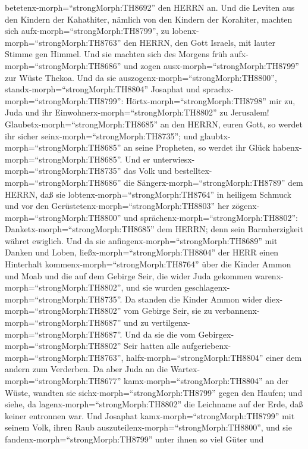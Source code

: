 betetenx-morph=``strongMorph:TH8692'' den HERRN an.  Und
die Leviten aus den Kindern der Kahathiter, nämlich von den Kindern der
Korahiter, machten sich aufx-morph=``strongMorph:TH8799'', zu
lobenx-morph=``strongMorph:TH8763'' den HERRN, den Gott Israels, mit
lauter Stimme gen Himmel.  Und sie machten sich des Morgens
früh aufx-morph=``strongMorph:TH8686'' und zogen
ausx-morph=``strongMorph:TH8799'' zur Wüste Thekoa. Und da sie
auszogenx-morph=``strongMorph:TH8800'',
standx-morph=``strongMorph:TH8804'' Josaphat und
sprachx-morph=``strongMorph:TH8799'': Hörtx-morph=``strongMorph:TH8798''
mir zu, Juda und ihr Einwohnerx-morph=``strongMorph:TH8802'' zu
Jerusalem! Glaubetx-morph=``strongMorph:TH8685'' an den HERRN, euren
Gott, so werdet ihr sicher seinx-morph=``strongMorph:TH8735''; und
glaubtx-morph=``strongMorph:TH8685'' an seine Propheten, so werdet ihr
Glück habenx-morph=``strongMorph:TH8685''.  Und er
unterwiesx-morph=``strongMorph:TH8735'' das Volk und
bestelltex-morph=``strongMorph:TH8686'' die
Sängerx-morph=``strongMorph:TH8789'' dem HERRN, daß sie
lobtenx-morph=``strongMorph:TH8764'' in heiligem Schmuck und vor den
Gerüstetenx-morph=``strongMorph:TH8803'' her
zögenx-morph=``strongMorph:TH8800'' und
sprächenx-morph=``strongMorph:TH8802'':
Danketx-morph=``strongMorph:TH8685'' dem HERRN; denn sein Barmherzigkeit
währet ewiglich.  Und da sie
anfingenx-morph=``strongMorph:TH8689'' mit Danken und Loben,
ließx-morph=``strongMorph:TH8804'' der HERR einen Hinterhalt
kommenx-morph=``strongMorph:TH8764'' über die Kinder Ammon und Moab und
die auf dem Gebirge Seir, die wider Juda gekommen
warenx-morph=``strongMorph:TH8802'', und sie wurden
geschlagenx-morph=``strongMorph:TH8735''.  Da standen die
Kinder Ammon wider diex-morph=``strongMorph:TH8802'' vom Gebirge Seir,
sie zu verbannenx-morph=``strongMorph:TH8687'' und zu
vertilgenx-morph=``strongMorph:TH8687''. Und da sie die vom
Gebirgex-morph=``strongMorph:TH8802'' Seir hatten alle
aufgeriebenx-morph=``strongMorph:TH8763'',
halfx-morph=``strongMorph:TH8804'' einer dem andern zum Verderben.
 Da aber Juda an die Wartex-morph=``strongMorph:TH8677''
kamx-morph=``strongMorph:TH8804'' an der Wüste, wandten sie
sichx-morph=``strongMorph:TH8799'' gegen den Haufen; und siehe, da
lagenx-morph=``strongMorph:TH8802'' die Leichname auf der Erde, daß
keiner entronnen war.  Und Josaphat
kamx-morph=``strongMorph:TH8799'' mit seinem Volk, ihren Raub
auszuteilenx-morph=``strongMorph:TH8800'', und sie
fandenx-morph=``strongMorph:TH8799'' unter ihnen so viel Güter und
